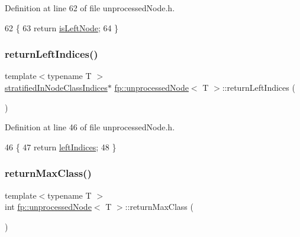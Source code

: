 Definition at line 62 of file unprocessed\+Node.\+h.


\begin{DoxyCode}
62                                               \{
63                     \textcolor{keywordflow}{return} \hyperlink{classfp_1_1unprocessedNode_a81b74c36ed1ac15d367e135e2fa0ba3d}{isLeftNode};
64                 \}
\end{DoxyCode}
\mbox{\label{classfp_1_1unprocessedNode_a8738e5776d4f2da34e328196beea11a5}} 
\subsubsection{\texorpdfstring{return\+Left\+Indices()}{returnLeftIndices()}}
{\footnotesize\ttfamily template$<$typename T $>$ \\
\hyperlink{classfp_1_1stratifiedInNodeClassIndices}{stratified\+In\+Node\+Class\+Indices}$\ast$ \hyperlink{classfp_1_1unprocessedNode}{fp\+::unprocessed\+Node}$<$ T $>$\+::return\+Left\+Indices (\begin{DoxyParamCaption}{ }\end{DoxyParamCaption})\hspace{0.3cm}{\ttfamily [inline]}}



Definition at line 46 of file unprocessed\+Node.\+h.


\begin{DoxyCode}
46                                                                         \{
47                     \textcolor{keywordflow}{return} \hyperlink{classfp_1_1unprocessedNode_a0a147fea04670ff34ef0891a14ec67a3}{leftIndices};
48                 \}
\end{DoxyCode}
\mbox{\label{classfp_1_1unprocessedNode_af038553809a2e6d1cbe04adaba1c6b21}} 
\subsubsection{\texorpdfstring{return\+Max\+Class()}{returnMaxClass()}}
{\footnotesize\ttfamily template$<$typename T $>$ \\
int \hyperlink{classfp_1_1unprocessedNode}{fp\+::unprocessed\+Node}$<$ T $>$\+::return\+Max\+Class (\begin{DoxyParamCaption}{ }\end{DoxyParamCaption})\hspace{0.3cm}{\ttfamily [inline]}}



